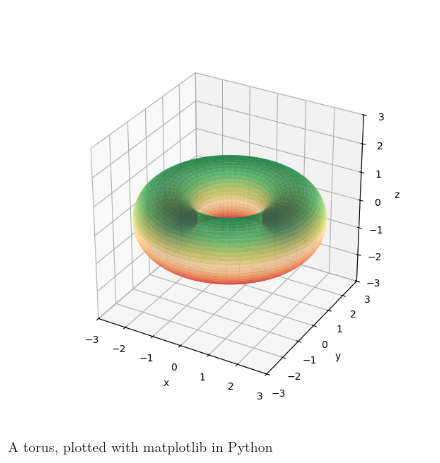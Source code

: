 \documentclass[a4paper]{article}
\begin{document}


\subsection{~}

\begin{figure}[h]
	\centering
	\includegraphics[scale=0.8]{Q3a-torus}
	\caption{A torus, plotted with matplotlib in Python}
	\label{fig:torus-plot}
\end{figure}
\end{document}
